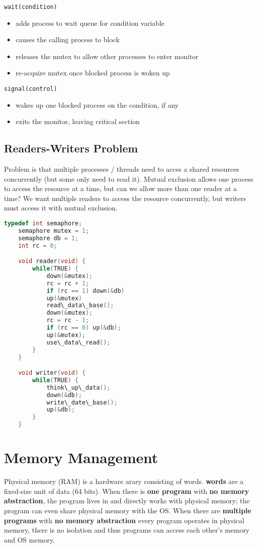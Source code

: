 \documentclass{article}
\newcommand{\bold}[1]{\textbf{#1}}
\renewcommand{\b}{\item[$\circ$]}
\newcommand{\newlist}{\begin{itemize}}
\renewcommand{\endlist}{\end{itemize}}
\begin{document}
    \noindent \texttt{wait(condition)}

    \newlist
    \b adds process to wait queue for condition variable
    \b causes the calling process to block
    \b releases the mutex to allow other processes to enter monitor 
    \b re-acquire mutex once blocked process is woken up
    \endlist 

    \noindent \texttt{signal(control)}
    \newlist
    \b wakes up one blocked process on the condition, if any
    \b exits the monitor, leaving critical section
    \endlist 

\subsection{Readers-Writers Problem}

    Problem is that multiple processes / threads need to acces a shared resources concurrently (but some only need to read it). Mutual exclusion allows one process to access the resource at a time, but can we allow more than one reader at a time? We want multiple readers to access the resource concurrently, but writers must access it with mutual exclusion. 

    \begin{lstlisting}[language=C]
    typedef int semaphore;
    semaphore mutex = 1;
    semaphore db = 1;
    int rc = 0;

    void reader(void) {
        while(TRUE) {
            down(&mutex);
            rc = rc + 1;
            if (rc == 1) down(&db)
            up(&mutex)
            read\_data\_base();
            down(&mutex);
            rc = rc - 1;
            if (rc == 0) up(&db);
            up(&mutex);
            use\_data\_read();
        }
    }

    void writer(void) {
        while(TRUE) {
            think\_up\_data();
            down(&db);
            write\_date\_base();
            up(&db);
        }
    }
    \end{lstlisting}

\newpage
\section{Memory Management}

Physical memory (RAM) is a hardware arary consisting of words. \bold{words} are a fixed-size unit of data (64 bits). When there is \bold{one program} with \bold{no memory abstraction}, the program lives in and directly works with physical memory; the program can even share physical memory with the OS. When there are \bold{multiple programs} with \bold{no memory abstraction} every program operates in physical memory, there is no isolation and thus programs can access each other's memory and OS memory. \\ 
\end{document}
